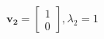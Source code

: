 \documentclass[preview]{standalone}
\begin{document}
\begin{align*}
\mathbf{v_2} = \begin{bmatrix} 1 \\ 0 \end{bmatrix}, \lambda_2 = 1
\end{align*}
\end{document}
